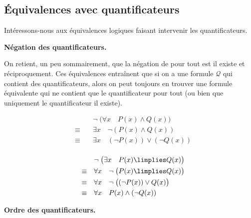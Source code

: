 \documentclass[11pt,class=report,crop=false]{standalone}
\begin{document}
\subsection{Équivalences avec quantificateurs}

Intéressons-nous aux équivalences logiques faisant intervenir les quantificateurs.

\textbf{Négation des quantificateurs.}



On retient, un peu sommairement, que la négation de \og{}pour tout\fg{} est \og{}il existe\fg{} et réciproquement.
Ces équivalences entraînent que si on a une formule $\mathcal{Q}$ qui contient des quantificateurs, alors on peut toujours en trouver une formule équivalente qui ne contient que le quantificateur \og{}pour tout\fg{} (ou bien que uniquement le quantificateur \og{}il existe\fg{}). 

\begin{exemple}
	\begin{align*}
							& \lnot\;\big( \forall x \quad P(x) \land Q(x) \big) \\
		\quad \equiv \quad	& \exists x \quad \lnot( P(x) \land Q(x) ) \\
		\quad \equiv \quad	& \exists x \quad (\lnot P(x)) \lor (\lnot Q(x)) \\
	\end{align*} 
	
	\begin{align*}
	& \lnot\;\big( \exists x \quad P(x) \limplies Q(x) \big) \\
	\quad \equiv \quad	& \forall x \quad \lnot\;\big( P(x) \limplies Q(x) \big) \\
	\quad \equiv \quad	& \forall x \quad \lnot\;\big( (\lnot P(x)) \lor Q(x) \big) \\	
	\quad \equiv \quad	& \forall x \quad P(x) \land (\lnot Q(x)) \\
\end{align*} 

\end{exemple}

\bigskip

\textbf{Ordre des quantificateurs.}
\end{document}
